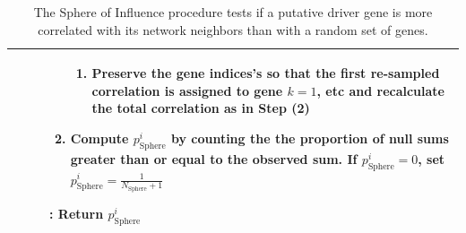 \documentclass[11pt]{article}
\begin{document}
\begin{table}[hb!]
\begin{tabular}{ p{\textwidth } }
\begin{description}
\begin{enumerate}
\begin{enumerate}
            \item Preserve the gene indices's so that the first 
              re-sampled correlation is assigned to gene $k=1$, etc and
              recalculate the total correlation as in Step (2)

        \end{enumerate}


       	\item Compute $p^i_{\text{Sphere}}$ by counting the the proportion of 
       		  null sums greater than or equal to the observed sum. 
            If $p^i_{\text{Sphere}} = 0$, set 
       		  $p^i_{\text{Sphere}}=\frac{1}{N_\text{Sphere}+1}$


    \end{enumerate}


    \item[\textbf{Output}]: Return $p^i_{\text{Sphere}}$


  \end{description} \\
  
  \hline
\end{tabular}

\caption{The Sphere of Influence procedure tests if a putative driver gene
is more correlated with its network neighbors than with a random set of genes.}

\label{tab:procedure-sphere}
\end{table}
\end{document}
